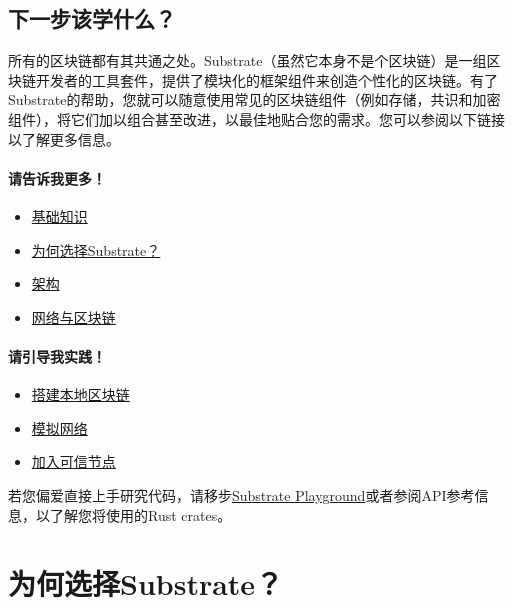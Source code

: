 \hypertarget{ux4e0bux4e00ux6b65ux8be5ux5b66ux4ec0ux4e48}{%
\subsection{下一步该学什么？}\label{ux4e0bux4e00ux6b65ux8be5ux5b66ux4ec0ux4e48}}

所有的区块链都有其共通之处。Substrate（虽然它本身不是个区块链）是一组区块链开发者的工具套件，提供了模块化的框架组件来创造个性化的区块链。有了Substrate的帮助，您就可以随意使用常见的区块链组件（例如存储，共识和加密组件），将它们加以组合甚至改进，以最佳地贴合您的需求。您可以参阅以下链接以了解更多信息。

\hypertarget{ux8bf7ux544aux8bc9ux6211ux66f4ux591a}{%
\paragraph{请告诉我更多！}\label{ux8bf7ux544aux8bc9ux6211ux66f4ux591a}}

\begin{itemize}
\item
  \href{/fundamentals/}{基础知识}
\item
  \href{/fundamentals/why-substrate/}{为何选择Substrate？}
\item
  \href{/fundamentals/architecture/}{架构}
\item
  \href{/fundamentals/node-and-network-types/}{网络与区块链}
\end{itemize}

\hypertarget{ux8bf7ux5f15ux5bfcux6211ux5b9eux8df5}{%
\paragraph{请引导我实践！}\label{ux8bf7ux5f15ux5bfcux6211ux5b9eux8df5}}

\begin{itemize}
\item
  \href{/tutorials/get-started/build-local-blockchain/}{搭建本地区块链}
\item
  \href{/tutorials/get-started/simulate-network/}{模拟网络}
\item
  \href{/tutorials/get-started/add-trusted-nodes/}{加入可信节点}
\end{itemize}

若您偏爱直接上手研究代码，请移步\href{https://docs.substrate.io/playground/}{Substrate
Playground}或者参阅API参考信息，以了解您将使用的Rust crates。

\section{为何选择Substrate？}

